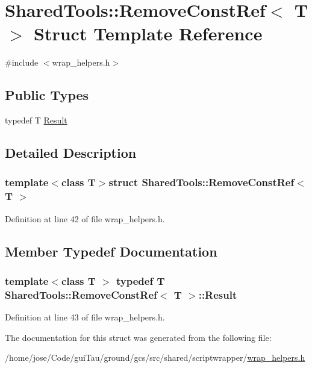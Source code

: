 \hypertarget{struct_shared_tools_1_1_remove_const_ref}{\section{Shared\-Tools\-:\-:Remove\-Const\-Ref$<$ T $>$ Struct Template Reference}
\label{struct_shared_tools_1_1_remove_const_ref}
}


{\ttfamily \#include $<$wrap\-\_\-helpers.\-h$>$}

\subsection*{Public Types}
\begin{DoxyCompactItemize}
\item 
typedef T \hyperlink{struct_shared_tools_1_1_remove_const_ref_afb1ad9d1c8a22e2b6cd23f7cb7a5c1d0}{Result}
\end{DoxyCompactItemize}


\subsection{Detailed Description}
\subsubsection*{template$<$class T$>$struct Shared\-Tools\-::\-Remove\-Const\-Ref$<$ T $>$}



Definition at line 42 of file wrap\-\_\-helpers.\-h.



\subsection{Member Typedef Documentation}
\hypertarget{struct_shared_tools_1_1_remove_const_ref_afb1ad9d1c8a22e2b6cd23f7cb7a5c1d0}{
\subsubsection[{Result}]{\setlength{\rightskip}{0pt plus 5cm}template$<$class T $>$ typedef T {\bf Shared\-Tools\-::\-Remove\-Const\-Ref}$<$ T $>$\-::{\bf Result}}}\label{struct_shared_tools_1_1_remove_const_ref_afb1ad9d1c8a22e2b6cd23f7cb7a5c1d0}


Definition at line 43 of file wrap\-\_\-helpers.\-h.



The documentation for this struct was generated from the following file\-:\begin{DoxyCompactItemize}
\item 
/home/jose/\-Code/gui\-Tau/ground/gcs/src/shared/scriptwrapper/\hyperlink{wrap__helpers_8h}{wrap\-\_\-helpers.\-h}\end{DoxyCompactItemize}
